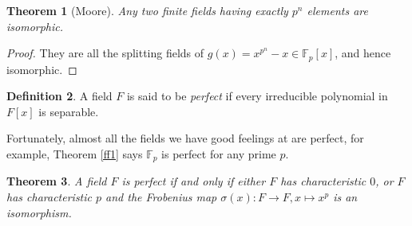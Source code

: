 \documentclass[12pt]{report}
\newtheorem{thm}{Theorem}[section]
\theoremstyle{definition}
\newtheorem{defn}[thm]{Definition}
\def\FF{\mathbb{F}}
\begin{document}
\begin{thm}[Moore]
    Any two finite fields having exactly $p^n$ elements are isomorphic.
\end{thm}

\begin{proof}
    They are all the splitting fields of $g(x)=x^{p^n}-x\in \FF_p[x]$, and hence isomorphic.
\end{proof}

\begin{defn}
    A field $F$ is said to be \emph{perfect} if every irreducible polynomial in $F[x]$ is separable.
\end{defn}

Fortunately, almost all the fields we have good feelings at are perfect, for example, Theorem \ref{ff1} says $\FF_p$ is perfect for any prime $p$.

\begin{thm}
    A field $F$ is perfect if and only if either $F$ has characteristic $0$, or $F$ has characteristic $p$ and the Frobenius map $\sigma(x): F\to F, x\mapsto x^p$ is an isomorphism.
\end{thm}
\end{document}
